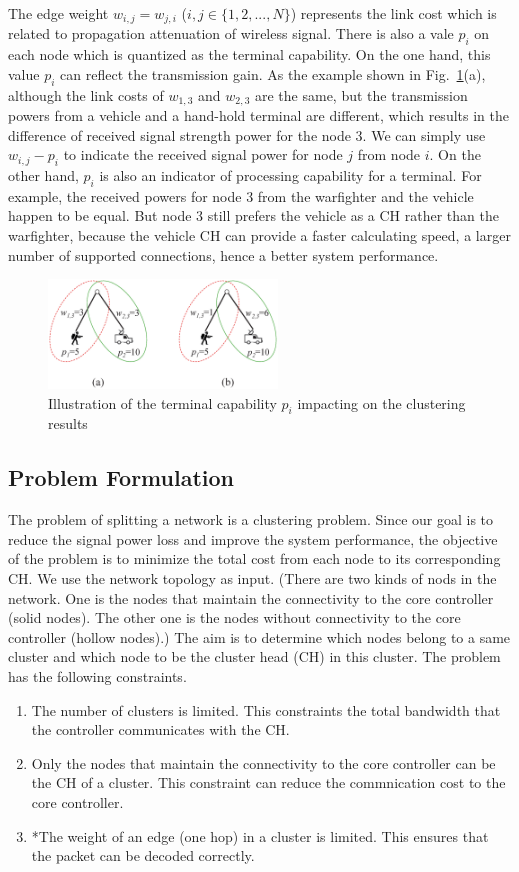 \documentclass[conference]{IEEEtran}
\begin{document}
The edge weight $w_{i,j}=w_{j,i}$ ($i,j \in \{ 1,2,...,N\}$) represents the link cost which is related to propagation attenuation of wireless signal. There is also a vale $p_i$ on each node which is quantized as the terminal capability. On the one hand, this value $p_i$ can reflect the transmission gain. As the example shown in Fig.~\ref{manvehicle}(a), although the link costs of $w_{1,3}$ and $w_{2,3}$ are the same, but the transmission powers from a vehicle and a hand-hold terminal are different, which results in the difference of received signal strength power for the node 3. We can simply use $w_{i,j}-p_i$ to indicate the received signal power for node $j$ from node $i$. On the other hand, $p_i$ is also an indicator of processing capability for a terminal. For example, the received powers for node 3 from the warfighter and the vehicle happen to be equal. But node 3 still prefers the vehicle as a CH rather than the warfighter, because the vehicle CH can provide a faster calculating speed, a larger number of supported connections, hence a better system performance.
\begin{figure}
\centering
\includegraphics[width=2.4in]{manvehicle}
\caption{Illustration of the terminal capability $p_i$ impacting on the clustering results}
\label{manvehicle}
\end{figure}

\subsection{Problem Formulation}

The problem of splitting a network is a clustering problem. Since our goal is to reduce the signal power loss and improve the system performance, the objective of the problem is to minimize the total cost from each node to its corresponding CH. We use the network topology as input. (There are two kinds of nods in the network. One is the nodes that maintain the connectivity to the core controller (solid nodes). The other one is the nodes without connectivity to the core controller (hollow nodes).) The aim is to determine which nodes belong to a same cluster and which node to be the cluster head (CH) in this cluster. The problem has the following constraints.
\begin{enumerate}
\item The number of clusters is limited. This constraints the total bandwidth that the controller communicates with the CH. 
\item Only the nodes that maintain the connectivity to the core controller can be the CH of a cluster. This constraint can reduce the commnication cost to the core controller.
\item *The weight of an edge (one hop) in a cluster is limited. This ensures that the packet can be decoded correctly.
\end{enumerate}
\end{document}
